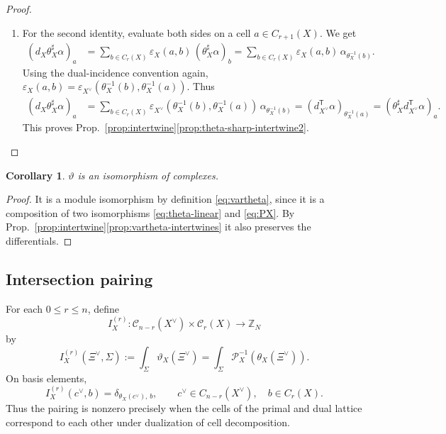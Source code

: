 \documentclass[dvipsnames,a4paper]{article}
\numberwithin{equation}{section}
\newtheorem{cor}[theorem]{Corollary}
\theoremstyle{definition}
\theoremstyle{remark}
\begin{document}
\begin{proof}
\begin{enumerate}
		\item For the second identity, evaluate both sides on a cell \(a\in C_{r+1}(X)\). We get
		\begin{align}
			\left(d_X\theta_X^\sharp\alpha\right)_a
			&=
			\sum_{b\in C_r(X)}
			\varepsilon_X(a,b)\,
			(\theta_X^\sharp\alpha)_b
			=
			\sum_{b\in C_r(X)}
			\varepsilon_X(a,b)\,
			\alpha_{\theta_X^{-1}(b)}.
		\end{align}
		Using the dual-incidence convention again, $\varepsilon_X(a,b) = \varepsilon_{X^\vee}\left(\theta_X^{-1}(b),\theta_X^{-1}(a)\right)$.
		Thus
		\begin{align*}
			\left(d_X\theta_X^\sharp\alpha\right)_a
			&=
			\sum_{b\in C_r(X)}
			\varepsilon_{X^\vee}\left(\theta_X^{-1}(b),\theta_X^{-1}(a)\right)\,
			\alpha_{\theta_X^{-1}(b)}
			=
			\left(d_{X^\vee}^{\mathsf T}\alpha\right)_{\theta_X^{-1}(a)}
			=
			\left(\theta_X^\sharp d_{X^\vee}^{\mathsf T}\alpha\right)_a.
		\end{align*}
		This proves Prop.~\ref{prop:intertwine}\ref{prop:theta-sharp-intertwine2}.
	\end{enumerate}
\end{proof}

\begin{cor}\label{cor:complexIso}
	$\vartheta$ is an isomorphism of complexes.
\end{cor}
\begin{proof}
	It is a module isomorphism by definition \eqref{eq:vartheta}, since it is a composition of two isomorphisms \eqref{eq:theta-linear} and \eqref{eq:PX}. By Prop.~\ref{prop:intertwine}\ref{prop:vartheta-intertwines} it also preserves the differentials.
\end{proof}


\subsection{Intersection pairing}
\label{sec:intersection}

For each \(0\le r\le n\), define
\begin{equation}
	I_X^{(r)}:
	\mathcal C_{n-r}(X^\vee)\times \mathcal C_r(X)\to \mathbb Z_N
	\label{eq:intersection}
\end{equation}
by
\begin{equation}
	I_X^{(r)}(\Xi^\vee,\Sigma)
	:=
	\int_\Sigma \vartheta_X(\Xi^\vee)
	=
	\int_\Sigma \mathcal P_X^{-1} \left(\theta_X(\Xi^\vee)\right).
	\label{eq:intersection-def}
\end{equation}
On basis elements,
\begin{equation}
	I_X^{(r)}(c^\vee,b)=\delta_{\theta_X(c^\vee),\,b},
	\qquad
	c^\vee\in C_{n-r}(X^\vee),\quad b\in C_r(X).
	\label{eq:intersection-basis}
\end{equation}
Thus the pairing is nonzero precisely when the cells of the primal and dual lattice correspond to each other under dualization of cell decomposition.
\end{document}

